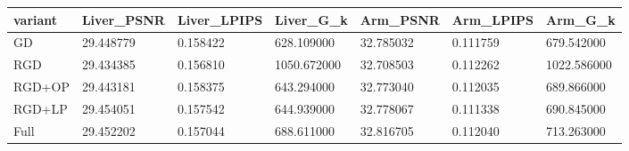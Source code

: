 \begin{tabular}{lllllll}
variant & Liver\_PSNR & Liver\_LPIPS & Liver\_G\_k & Arm\_PSNR & Arm\_LPIPS & Arm\_G\_k \\
\hline
GD & 29.448779 & 0.158422 & 628.109000 & 32.785032 & 0.111759 & 679.542000 \\
RGD & 29.434385 & 0.156810 & 1050.672000 & 32.708503 & 0.112262 & 1022.586000 \\
RGD+OP & 29.443181 & 0.158375 & 643.294000 & 32.773040 & 0.112035 & 689.866000 \\
RGD+LP & 29.454051 & 0.157542 & 644.939000 & 32.778067 & 0.111338 & 690.845000 \\
Full & 29.452202 & 0.157044 & 688.611000 & 32.816705 & 0.112040 & 713.263000 \\
\end{tabular}
